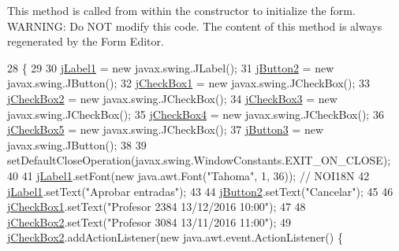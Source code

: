 This method is called from within the constructor to initialize the form. W\+A\+R\+N\+I\+NG\+: Do N\+OT modify this code. The content of this method is always regenerated by the Form Editor. 
\begin{DoxyCode}
28                                   \{
29 
30         \mbox{\hyperlink{classinterfacessoguar_1_1cu14_ae89f56f50be4fe2708a41087efcd4f01}{jLabel1}} = \textcolor{keyword}{new} javax.swing.JLabel();
31         \mbox{\hyperlink{classinterfacessoguar_1_1cu14_aac32954c8931314e7a2554cb59e49c14}{jButton2}} = \textcolor{keyword}{new} javax.swing.JButton();
32         \mbox{\hyperlink{classinterfacessoguar_1_1cu14_a2719e7cf9ebc34ab6a28e47fe931c20c}{jCheckBox1}} = \textcolor{keyword}{new} javax.swing.JCheckBox();
33         \mbox{\hyperlink{classinterfacessoguar_1_1cu14_a208f32a207595bd065c51596f0071a50}{jCheckBox2}} = \textcolor{keyword}{new} javax.swing.JCheckBox();
34         \mbox{\hyperlink{classinterfacessoguar_1_1cu14_a4c2786ad18eecca82117bb2332a5cd4e}{jCheckBox3}} = \textcolor{keyword}{new} javax.swing.JCheckBox();
35         \mbox{\hyperlink{classinterfacessoguar_1_1cu14_ae6475562256fe6faa9f5f9cd776c64ab}{jCheckBox4}} = \textcolor{keyword}{new} javax.swing.JCheckBox();
36         \mbox{\hyperlink{classinterfacessoguar_1_1cu14_a76e9292b610a4832a729e128895d01cf}{jCheckBox5}} = \textcolor{keyword}{new} javax.swing.JCheckBox();
37         \mbox{\hyperlink{classinterfacessoguar_1_1cu14_a11bd8f94543f8cf53621a6e49d32df73}{jButton3}} = \textcolor{keyword}{new} javax.swing.JButton();
38 
39         setDefaultCloseOperation(javax.swing.WindowConstants.EXIT\_ON\_CLOSE);
40 
41         \mbox{\hyperlink{classinterfacessoguar_1_1cu14_ae89f56f50be4fe2708a41087efcd4f01}{jLabel1}}.setFont(\textcolor{keyword}{new} java.awt.Font(\textcolor{stringliteral}{"Tahoma"}, 1, 36)); \textcolor{comment}{// NOI18N}
42         \mbox{\hyperlink{classinterfacessoguar_1_1cu14_ae89f56f50be4fe2708a41087efcd4f01}{jLabel1}}.setText(\textcolor{stringliteral}{"Aprobar entradas"});
43 
44         \mbox{\hyperlink{classinterfacessoguar_1_1cu14_aac32954c8931314e7a2554cb59e49c14}{jButton2}}.setText(\textcolor{stringliteral}{"Cancelar"});
45 
46         \mbox{\hyperlink{classinterfacessoguar_1_1cu14_a2719e7cf9ebc34ab6a28e47fe931c20c}{jCheckBox1}}.setText(\textcolor{stringliteral}{"Profesor 2384 13/12/2016 10:00"});
47 
48         \mbox{\hyperlink{classinterfacessoguar_1_1cu14_a208f32a207595bd065c51596f0071a50}{jCheckBox2}}.setText(\textcolor{stringliteral}{"Profesor 3084 13/11/2016 11:00"});
49         \mbox{\hyperlink{classinterfacessoguar_1_1cu14_a208f32a207595bd065c51596f0071a50}{jCheckBox2}}.addActionListener(\textcolor{keyword}{new} java.awt.event.ActionListener() \{

\end{DoxyCode}
